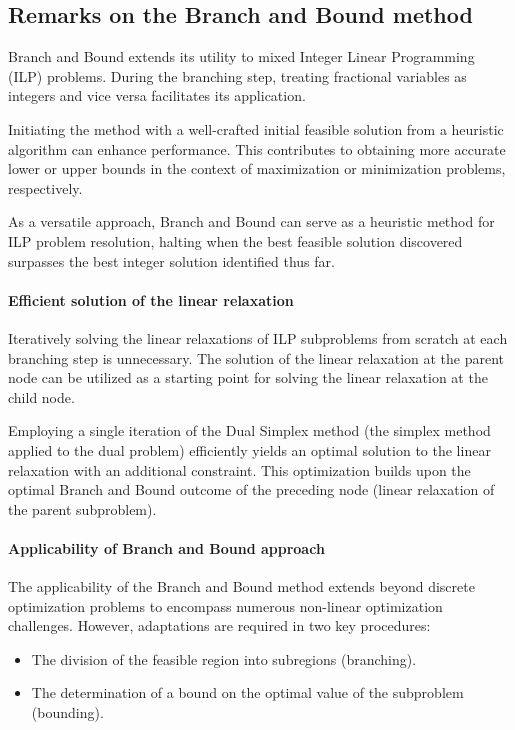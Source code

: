 \subsection{Remarks on the Branch and Bound method}
Branch and Bound extends its utility to mixed Integer Linear Programming (ILP) problems. During the branching step, treating fractional variables as integers and vice versa facilitates its application.

Initiating the method with a well-crafted initial feasible solution from a heuristic algorithm can enhance performance. 
This contributes to obtaining more accurate lower or upper bounds in the context of maximization or minimization problems, respectively.

As a versatile approach, Branch and Bound can serve as a heuristic method for ILP problem resolution, halting when the best feasible solution discovered surpasses the best integer solution identified thus far.

\paragraph*{Efficient solution of the linear relaxation}
Iteratively solving the linear relaxations of ILP subproblems from scratch at each branching step is unnecessary. 
The solution of the linear relaxation at the parent node can be utilized as a starting point for solving the linear relaxation at the child node.

Employing a single iteration of the Dual Simplex method (the simplex method applied to the dual problem) efficiently yields an optimal solution to the linear relaxation with an additional constraint. 
This optimization builds upon the optimal Branch and Bound outcome of the preceding node (linear relaxation of the parent subproblem).

\paragraph*{Applicability of Branch and Bound approach}
The applicability of the Branch and Bound method extends beyond discrete optimization problems to encompass numerous non-linear optimization challenges. 
However, adaptations are required in two key procedures:
\begin{itemize}
    \item The division of the feasible region into subregions (branching).
    \item The determination of a bound on the optimal value of the subproblem (bounding).
\end{itemize}